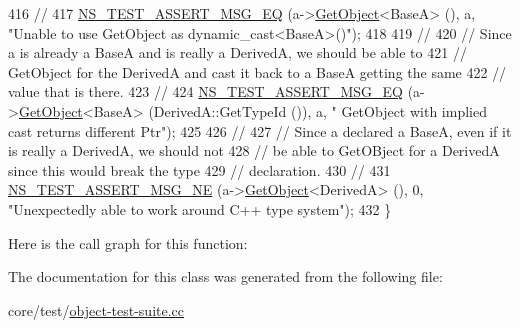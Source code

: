 \begin{DoxyCode}
416   \textcolor{comment}{//}
417   \hyperlink{group__testing_ga2a9d78cffb3db8e867c35fff0b698cf5}{NS\_TEST\_ASSERT\_MSG\_EQ} (a->\hyperlink{classns3_1_1Object_a13e18c00017096c8381eb651d5bd0783}{GetObject}<BaseA> (), a, \textcolor{stringliteral}{"Unable to use GetObject
       as dynamic\_cast<BaseA>()"});
418 
419   \textcolor{comment}{//}
420   \textcolor{comment}{// Since a is already a BaseA and is really a DerivedA, we should be able to}
421   \textcolor{comment}{// GetObject for the DerivedA and cast it back to a BaseA getting the same}
422   \textcolor{comment}{// value that is there.}
423   \textcolor{comment}{//}
424   \hyperlink{group__testing_ga2a9d78cffb3db8e867c35fff0b698cf5}{NS\_TEST\_ASSERT\_MSG\_EQ} (a->\hyperlink{classns3_1_1Object_a13e18c00017096c8381eb651d5bd0783}{GetObject}<BaseA> (DerivedA::GetTypeId ()), a, \textcolor{stringliteral}{"
      GetObject with implied cast returns different Ptr"});
425 
426   \textcolor{comment}{//}
427   \textcolor{comment}{// Since a declared a BaseA, even if it is really a DerivedA, we should not}
428   \textcolor{comment}{// be able to GetOBject for a DerivedA since this would break the type}
429   \textcolor{comment}{// declaration.}
430   \textcolor{comment}{//}
431   \hyperlink{group__testing_ga73d66fb0050a5111453fd144e767b91a}{NS\_TEST\_ASSERT\_MSG\_NE} (a->\hyperlink{classns3_1_1Object_a13e18c00017096c8381eb651d5bd0783}{GetObject}<DerivedA> (), 0, \textcolor{stringliteral}{"Unexpectedly able to
       work around C++ type system"});
432 \}
\end{DoxyCode}


Here is the call graph for this function\+:




The documentation for this class was generated from the following file\+:\begin{DoxyCompactItemize}
\item 
core/test/\hyperlink{object-test-suite_8cc}{object-\/test-\/suite.\+cc}\end{DoxyCompactItemize}
